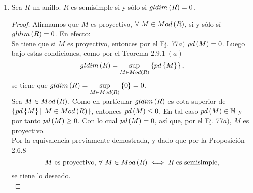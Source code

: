 \documentclass{article}
\begin{document}
\begin{enumerate}[label=\textbf{Ej \arabic*.}]
\begin{proof}
			Como la sucesión es exacta, entonces por el ejercicio 38 se tiene que $M$ es isomorfo a $P_0$ el cual es inyectivo, por lo tanto $M$ es inyectivo.
		\end{proof}
		
		\item Sea $R$ un anillo. $R$ es semisimple si y sólo si $gldim\left(R\right)=0$.
		\begin{proof}
			Afirmamos que $M$ es proyectivo, $\forall\ M\in Mod\left(R\right)$, si y sólo sí $gldim\left(R\right)=0$. En efecto:\\
			\boxed{\implies} Se tiene que si $M$ es proyectivo, entonces por el Ej. 77$a)$ $pd\left(M\right)=0$. Luego bajo estas condiciones, como por el Teorema $2.9.1\ (a)$ \begin{equation*}
				gldim\left(R\right)=\sup\limits_{M\in Mod\left(R\right)}\left\{pd\left\{M\right\}\right\},
			\end{equation*} se tiene que $gldim\left(R\right)=\sup\limits_{M\in Mod\left(R\right)}\left\{0\right\}=0$.\\
			\boxed{\impliedby} Sea $M\in Mod\left(R\right)$. Como en partícular $gldim\left(R\right)$ es cota superior de $\lrbrack{pd\lrbrack{M}\ \vline\ M\in Mod\lrprth{R}}$, entonces $pd\left(M\right)\leq 0$. En tal caso $pd\left(M\right)\in\mathbb{N}$ y por tanto $pd\left(M\right)\geq 0$. Con lo cual $pd\left(M\right)=0$, así que, por el Ej. 77$a)$, $M$ es proyectivo.\\
			Por la equivalencia previamente demostrada, y dado que por la Proposición 2.6.8 \begin{equation*}
				M \text{ es proyectivo, }\forall\ M\in Mod\left(R\right) \iff R\text{ es semisimple,}
			\end{equation*}se tiene lo deseado.\\
		\end{proof}
	\end{enumerate}
\end{document}
